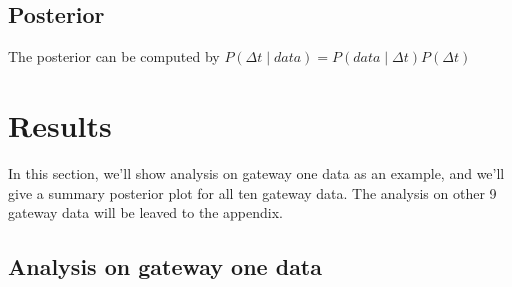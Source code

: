 \documentclass[\docopts]{\docclass}
\begin{document}
\subsection{Posterior}
The posterior can be computed by
$P(\Delta t \mid data) = P(data \mid \Delta t) P(\Delta t)$

\section{Results}
\label{sec:results}
In this section, we'll show analysis on gateway one data as an example, and we'll give a summary posterior plot for all ten gateway data. The analysis on other 9 gateway data  will be leaved to the appendix.

\subsection{Analysis on gateway one data}
\end{document}

